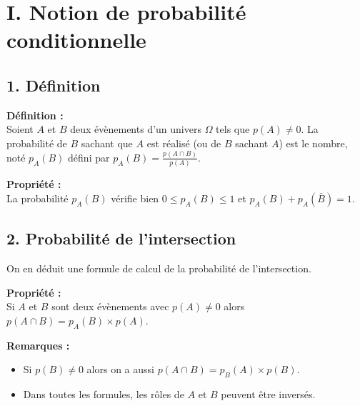 \documentclass[11pt,a4paper]{article}
\title{\doctitre}
\author{\docniveau \\ \doctheme\text{ - }\doctype}
\date{}
\begin{document}
\maketitle
\pagestyle{custom}
\thispagestyle{custom}

\section*{I. Notion de probabilité conditionnelle}

\subsection*{1. Définition}

\begin{mdframed}[style=definitionStyle]
  \textbf{Définition :} ~\\
  Soient $A$ et $B$ deux évènements d'un univers $\Omega$ tels que $p(A)\not= 0$.
  La probabilité de $B$ sachant que $A$ est réalisé (ou de $B$ sachant $A$) est le nombre, noté $p_A(B)$ défini par $\displaystyle{}p_A(B)=\frac{p(A\cap B)}{p(A)}$.
\end{mdframed}

\begin{mdframed}[style=proprieteStyle]
  \textbf{Propriété :} ~\\
  La probabilité $p_A(B)$ vérifie bien $0\leq p_A(B)\leq1$ et $p_A(B)+p_A(\bar B)=1$.
\end{mdframed}

\subsection*{2. Probabilité de l'intersection}

On en déduit une formule de calcul de la probabilité de l'intersection.

\begin{mdframed}[style=proprieteStyle]
  \textbf{Propriété :} ~\\
  Si $A$ et $B$ sont deux évènements avec $p(A)\not=0$ alors $p(A\cap B)=p_A(B)\times p(A)$.
\end{mdframed}

\textbf{Remarques :} 
\vspace{-3pt}
\begin{itemize}
  \item Si $p(B)\not=0$ alors on a aussi $p(A\cap B)=p_B(A)\times p(B)$.
  \item Dans toutes les formules, les rôles de $A$ et $B$ peuvent être inversés.
\end{itemize}
\end{document}
